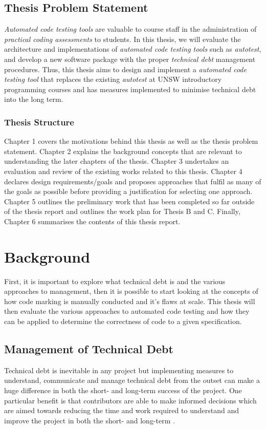 \documentclass[hidelinks]{report}
\newcommand{\unchapter}[2]{
    \setcounter{chapter}{#1}
    \setcounter{section}{0}
    \chapter*{#2}
    \addcontentsline{toc}{chapter}{#2}
}
\begin{document}
\section{Thesis Problem Statement}
\textit{Automated code testing tools} are valuable to course staff in the administration of \textit{practical coding assessments} to students. In this thesis, we will evaluate the architecture and implementations of \textit{automated code testing tools} such as \textit{autotest}, and develop a new software package with the proper \textit{technical debt} management procedures. Thus, this thesis aims to design and implement a \textit{automated code testing tool} that replaces the existing \textit{autotest} at UNSW introductory programming courses and has measures implemented to minimise technical debt into the long term.

\subsection{Thesis Structure}

Chapter 1 covers the motivations behind this thesis as well as the thesis problem statement.
Chapter 2 explains the background concepts that are relevant to understanding the later chapters of the thesis. Chapter 3 undertakes an evaluation and review of the existing works related to this thesis.
Chapter 4 declares design requirements/goals and proposes approaches that fulfil as many of the goals as possible before providing a justification for selecting one approach.
Chapter 5 outlines the preliminary work that has been completed so far outside of the thesis report and outlines the work plan for Thesis B and C.
Finally, Chapter 6 summarises the contents of this thesis report.

\unchapter{2}{Background}

First, it is important to explore what technical debt is and the various approaches to management, then it is possible to start looking at the concepts of how code marking is manually conducted and it's flaws at scale. This thesis will then evaluate the various approaches to automated code testing and how they can be applied to determine the correctness of code to a given specification.

\section{Management of Technical Debt}

Technical debt is inevitable in any project but implementing measures to understand, communicate and manage technical debt from the outset can make a huge difference in both the short- and long-term success of the project. One particular benefit is that contributors are able to make informed decisions which are aimed towards reducing the time and work required to understand and improve the project in both the short- and long-term \cite{TechnicalDebtManagement}.
\end{document}
